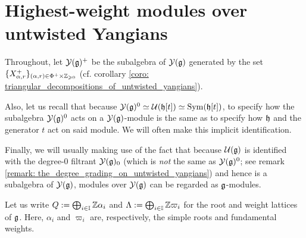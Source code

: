 \section{Highest-weight modules over untwisted Yangians} \label{section: highest_weight_modules_for_untwisted_yangians}
    \begin{convention}
        Throughout, let $\mathcal{Y}(\mathfrak{g})^+$ be the  subalgebra of $\mathcal{Y}(\mathfrak{g})$ generated by the set $\{ X^+_{\alpha, r} \}_{(\alpha, r) \in \Phi^+ \x \Z_{\geq 0}}$ (cf. corollary \ref{coro: triangular_decompositions_of_untwisted_yangians}).

        Also, let us recall that because $\mathcal{Y}(\mathfrak{g})^0 \simeq \mathcal{U}(\mathfrak{h}[t]) \simeq \mathrm{Sym}(\mathfrak{h}[t])$, to specify how the subalgebra $\mathcal{Y}(\mathfrak{g})^0$ acts on a $\mathcal{Y}(\mathfrak{g})$-module is the same as to specify how $\mathfrak{h}$ and the generator $t$ act on said module. We will often make this implicit identification.

        Finally, we will usually making use of the fact that because $\mathcal{U}(\mathfrak{g})$ is identified with the degree-$0$ filtrant $\mathcal{Y}(\mathfrak{g})_0$ (which is \textit{not} the same as $\mathcal{Y}(\mathfrak{g})^0$; see remark \ref{remark: the_degree_grading_on_untwisted_yangians}) and hence is a subalgebra of $\mathcal{Y}(\mathfrak{g})$, modules over $\mathcal{Y}(\mathfrak{g})$ can be regarded as $\mathfrak{g}$-modules.
    \end{convention}

    \begin{convention}
        Let us write $Q := \bigoplus_{i \in \mathbb{I}} \mathbb{Z} \alpha_i$ and $\Lambda := \bigoplus_{i \in \mathbb{I}} \mathbb{Z} \varpi_i$ for the root and weight lattices of $\mathfrak{g}$. Here, $\alpha_i$ and $\varpi_i$ are, respectively, the simple roots and fundamental weights.
    \end{convention}

